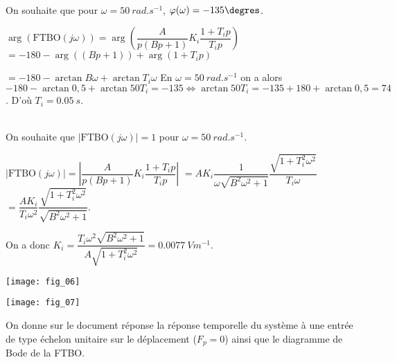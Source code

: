 \ifprof
\begin{corrige}~\\
On souhaite que  pour $\omega=\SI{50}{rad.s^{-1}}$, $\varphi(\omega)=-135\degres $.

$\arg\left(\text{FTBO}(j\omega)\right) =\arg\left(\dfrac{A}{p\left(Bp+1\right)}K_i\dfrac{1+T_ip}{T_ip}\right)	$
$ =-180-\arg\left(\left(Bp+1\right)\right)  + \arg\left(1+T_ip\right)	$

$ =-180-\arctan B\omega + \arctan T_i \omega 	$
En $\omega=\SI{50}{rad.s^{-1}}$ on a alors 
$ -180-\arctan 0,5 + \arctan 50T_i =-135 \Leftrightarrow  \arctan 50T_i =-135+180+\arctan 0,5 =74$. D'où $T_i = \SI{0,05}{s}$.
\end{corrige}
\else
\fi




\ifprof
\begin{corrige}~\\
On souhaite que $|\text{FTBO}(j\omega)|=1$ pour $\omega=\SI{50}{rad.s^{-1}}$.

$|\text{FTBO}(j\omega)| =\left|\dfrac{A}{p\left(Bp+1\right)}K_i\dfrac{1+T_ip}{T_ip}\right|$
$=A K_i\dfrac{1}{\omega \sqrt{B^2\omega^2+1}}\dfrac{\sqrt{1+T_i^2\omega^2}}{T_i \omega }$
$=\dfrac{A K_i}{T_i \omega^2}\dfrac{\sqrt{1+T_i^2\omega^2}}{ \sqrt{B^2\omega^2+1}}$.

On a donc $K_i = \dfrac{T_i \omega^2\sqrt{B^2\omega^2+1}}{A\sqrt{1+T_i^2\omega^2}}=\SI{0,0077}{Vm^{-1}}$.

\end{corrige}
\else
\fi

\newpage

\ifprof
\else
\begin{marginfigure}
\texttt{[image: fig\_06]}
\end{marginfigure}

\begin{marginfigure}
\texttt{[image: fig\_07]}
\end{marginfigure}
\fi


On donne sur le document réponse la réponse temporelle du système à une entrée de type échelon unitaire sur le déplacement ($F_p=0$) ainsi que le diagramme de Bode de la FTBO.

